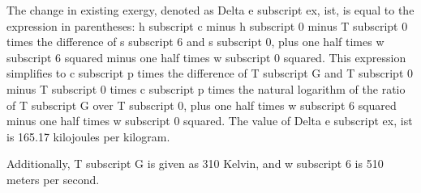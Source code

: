 The change in existing exergy, denoted as Delta e subscript ex, ist, is equal to the expression in parentheses: h subscript c minus h subscript 0 minus T subscript 0 times the difference of s subscript 6 and s subscript 0, plus one half times w subscript 6 squared minus one half times w subscript 0 squared. This expression simplifies to c subscript p times the difference of T subscript G and T subscript 0 minus T subscript 0 times c subscript p times the natural logarithm of the ratio of T subscript G over T subscript 0, plus one half times w subscript 6 squared minus one half times w subscript 0 squared. The value of Delta e subscript ex, ist is 165.17 kilojoules per kilogram.

Additionally, T subscript G is given as 310 Kelvin, and w subscript 6 is 510 meters per second.